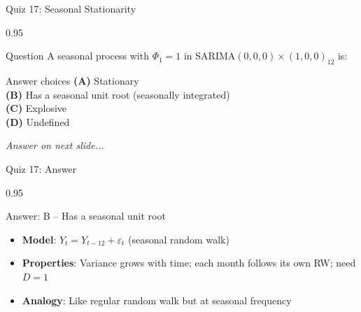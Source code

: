 \documentclass[9pt, aspectratio=169, t]{beamer}
\begin{document}
\begin{frame}{Quiz 17: Seasonal Stationarity}
    \begin{cminipage}{0.95\textwidth}
    \begin{alertblock}{Question}
        A seasonal process with $\Phi_1 = 1$ in SARIMA$(0,0,0) \times (1,0,0)_{12}$ is:
    \end{alertblock}

    \vspace{0.4cm}

    \begin{block}{Answer choices}
        \textcolor{MainBlue}{\textbf{(A)}} Stationary\\[3pt]
        \textcolor{MainBlue}{\textbf{(B)}} Has a seasonal unit root (seasonally integrated)\\[3pt]
        \textcolor{MainBlue}{\textbf{(C)}} Explosive\\[3pt]
        \textcolor{MainBlue}{\textbf{(D)}} Undefined
    \end{block}

    \vspace{0.5cm}

    \begin{center}
        \textit{Answer on next slide...}
    \end{center}
    \end{cminipage}
\end{frame}

\begin{frame}{Quiz 17: Answer}
    \begin{cminipage}{0.95\textwidth}
    \begin{exampleblock}{Answer: B -- Has a seasonal unit root}
        \begin{itemize}
            \item \textbf{Model}: $Y_t = Y_{t-12} + \varepsilon_t$ (seasonal random walk)
            \item \textbf{Properties}: Variance grows with time; each month follows its own RW; need $D = 1$
            \item \textbf{Analogy}: Like regular random walk but at seasonal frequency
        \end{itemize}
    \end{exampleblock}

    \end{cminipage}
\end{frame}
\end{document}

